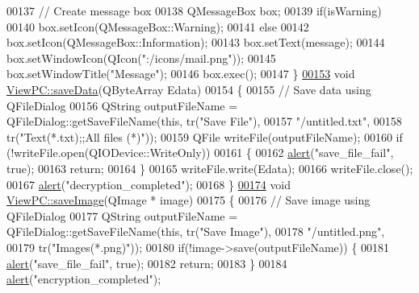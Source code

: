 \begin{DoxyCode}
00137     \textcolor{comment}{// Create message box}
00138     QMessageBox box;
00139     \textcolor{keywordflow}{if}(isWarning)
00140         box.setIcon(QMessageBox::Warning);
00141     \textcolor{keywordflow}{else}
00142         box.setIcon(QMessageBox::Information);
00143     box.setText(message);
00144     box.setWindowIcon(QIcon(\textcolor{stringliteral}{":/icons/mail.png"}));
00145     box.setWindowTitle(\textcolor{stringliteral}{"Message"});
00146     box.exec();
00147 \}
\hypertarget{viewpc_8cpp_source.tex_l00153}{}\hyperlink{class_view_p_c_aaff156103970be7c777beedaf0020604}{00153} \textcolor{keywordtype}{void} \hyperlink{class_view_p_c_aaff156103970be7c777beedaf0020604}{ViewPC::saveData}(QByteArray Edata)
00154 \{
00155     \textcolor{comment}{// Save data using QFileDialog}
00156     QString outputFileName = QFileDialog::getSaveFileName(\textcolor{keyword}{this}, tr(\textcolor{stringliteral}{"Save File"}),
00157                                \textcolor{stringliteral}{"/untitled.txt"},
00158                                tr(\textcolor{stringliteral}{"Text(*.txt);;All files (*)"}));
00159     QFile writeFile(outputFileName);
00160     \textcolor{keywordflow}{if} (!writeFile.open(QIODevice::WriteOnly))
00161     \{
00162         \hyperlink{class_view_p_c_a7c467169467789561078abc9d4fe57bd}{alert}(\textcolor{stringliteral}{"save\_file\_fail"}, \textcolor{keyword}{true});
00163         \textcolor{keywordflow}{return};
00164     \}
00165     writeFile.write(Edata);
00166     writeFile.close();
00167     \hyperlink{class_view_p_c_a7c467169467789561078abc9d4fe57bd}{alert}(\textcolor{stringliteral}{"decryption\_completed"});
00168 \}
\hypertarget{viewpc_8cpp_source.tex_l00174}{}\hyperlink{class_view_p_c_a7901ce10ffaaf2387bef1db7feea342d}{00174} \textcolor{keywordtype}{void} \hyperlink{class_view_p_c_a7901ce10ffaaf2387bef1db7feea342d}{ViewPC::saveImage}(QImage * image)
00175 \{
00176     \textcolor{comment}{// Save image using QFileDialog}
00177     QString outputFileName = QFileDialog::getSaveFileName(\textcolor{keyword}{this}, tr(\textcolor{stringliteral}{"Save Image"}),
00178                                \textcolor{stringliteral}{"/untitled.png"},
00179                                tr(\textcolor{stringliteral}{"Images(*.png)"}));
00180     \textcolor{keywordflow}{if}(!image->save(outputFileName)) \{
00181         \hyperlink{class_view_p_c_a7c467169467789561078abc9d4fe57bd}{alert}(\textcolor{stringliteral}{"save\_file\_fail"}, \textcolor{keyword}{true});
00182         \textcolor{keywordflow}{return};
00183     \}
00184     \hyperlink{class_view_p_c_a7c467169467789561078abc9d4fe57bd}{alert}(\textcolor{stringliteral}{"encryption\_completed"});

\end{DoxyCode}
